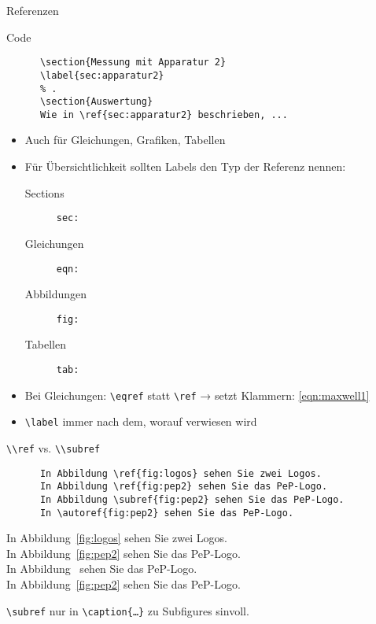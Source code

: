 \begin{frame}[fragile]{Referenzen}
  \begin{block}{Code}
    \begin{lstlisting}
      \section{Messung mit Apparatur 2}
      \label{sec:apparatur2}
      % .
      \section{Auswertung}
      Wie in \ref{sec:apparatur2} beschrieben, ...
    \end{lstlisting}
  \end{block}
  \begin{itemize}
    \item Auch für Gleichungen, Grafiken, Tabellen
    \item Für Übersichtlichkeit sollten Labels den Typ der Referenz nennen:
      \begin{description}
        \item[Sections]    \texttt{sec:}
        \item[Gleichungen] \texttt{eqn:}
        \item[Abbildungen] \texttt{fig:}
        \item[Tabellen]    \texttt{tab:}
      \end{description}
    \item Bei Gleichungen: \lstinline+\eqref+ statt \lstinline+\ref+ → setzt Klammern: \eqref{eqn:maxwell1}
    \item \lstinline+\label+ immer nach dem, worauf verwiesen wird
  \end{itemize}
\end{frame}

\begin{frame}[fragile]{\lstinline+\\ref+ vs. \lstinline+\\subref+}
  \begin{CodeExample}{0.47}
    \begin{lstlisting}
      In Abbildung \ref{fig:logos} sehen Sie zwei Logos.
      In Abbildung \ref{fig:pep2} sehen Sie das PeP-Logo.
      In Abbildung \subref{fig:pep2} sehen Sie das PeP-Logo.
      In \autoref{fig:pep2} sehen Sie das PeP-Logo.
    \end{lstlisting}
    \CodeResult
      \strut
      In Abbildung~\ref{fig:logos} sehen Sie zwei Logos. \\[\baselineskip]
      In Abbildung~\ref{fig:pep2} sehen Sie das PeP-Logo. \\[\baselineskip]
      In Abbildung~ sehen Sie das PeP-Logo.\\[\baselineskip]
      In Abbildung~\ref{fig:pep2} sehen Sie das PeP-Logo.
  \end{CodeExample}
  \vspace{2em}
  \lstinline+\subref+ nur in \lstinline+\caption{…}+ zu Subfigures sinvoll.
\end{frame}

